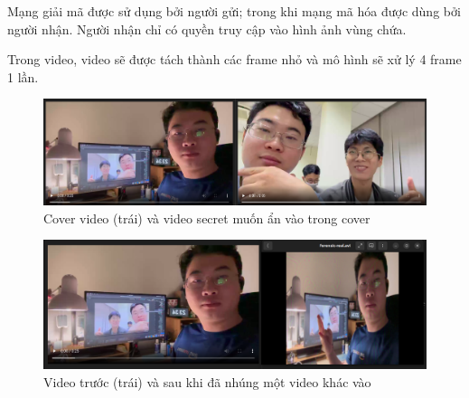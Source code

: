 Mạng giải mã được sử dụng bởi người gửi; trong khi mạng mã hóa được dùng bởi người nhận. Người nhận chỉ có quyền truy cập vào hình ảnh vùng chứa. 

Trong video, video sẽ được tách thành các frame nhỏ và mô hình sẽ xử lý 4 frame 1 lần.


\begin{figure}
    \centering
    \includegraphics[scale=0.4]{graphics/chapter-3/chap3-video-hiding-to-video.png}
    \caption{Cover video (trái) và video secret muốn ẩn vào trong cover}
    \label{fig:chap3-video-hiding-to-video}
\end{figure}

\begin{figure}
    \centering
    \includegraphics[scale=0.4]{graphics/chapter-3/chap3-video-after-hiding.png}
    \caption{Video trước (trái) và sau khi đã nhúng một video khác vào}
    \label{fig:enter-label}
\end{figure}